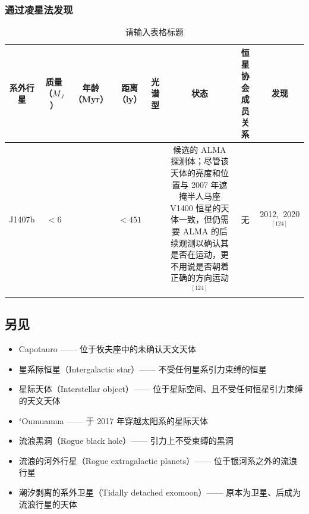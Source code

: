 \subsubsection{通过凌星法发现}
\begin{table}[ht]
\centering
\caption{请输入表格标题}\label{tab_RoPl3}
\begin{tabular}{|c|c|c|c|c|c|c|c|}
\hline
\textbf{系外行星} & \textbf{ 质量（$M_J$）} & \textbf{年龄（Myr）} &\textbf{ 距离（ly）} & \textbf{光谱型} & \textbf{状态} & \textbf{ 恒星协会成员关系} &\textbf{发现} \\
\hline
J1407b  & $<6$ &   & $<451$ &  & 候选的 ALMA 探测体；尽管该天体的亮度和位置与 2007 年遮掩半人马座 V1400 恒星的天体一致，但仍需要 ALMA 的后续观测以确认其是否在运动，更不用说是否朝着正确的方向运动$^{[124]}$  & 无  & 2012,~2020$^{[124]}$\\
\hline
\end{tabular}
\end{table}
\subsection{另见}
\begin{itemize}
\item Capotauro —— 位于牧夫座中的未确认天文天体  
\item 星系际恒星（Intergalactic star）—— 不受任何星系引力束缚的恒星  
\item 星际天体（Interstellar object）—— 位于星际空间、且不受任何恒星引力束缚的天文天体  
\item ʻOumuamua —— 于 2017 年穿越太阳系的星际天体  
\item 流浪黑洞（Rogue black hole）—— 引力上不受束缚的黑洞  
\item 流浪的河外行星（Rogue extragalactic planets）—— 位于银河系之外的流浪行星  
\item 潮汐剥离的系外卫星（Tidally detached exomoon）—— 原本为卫星、后成为流浪行星的天体
\end{itemize}  
